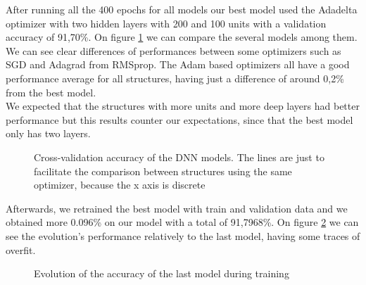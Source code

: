 \documentclass[journal, a4paper]{IEEEtran}
\begin{document}
    After running all the 400 epochs for all models our best model
used the Adadelta optimizer with two hidden layers with 200 and 100 units
with a validation accuracy of 91,70\%. On figure \ref{fig:cross_val_dnn}
we can compare the several models among them. \\ We can see clear differences of performances
between some optimizers such as SGD and Adagrad from RMSprop. The Adam based optimizers all
have a good performance average for all structures, having just a difference of around
0,2\% from the best model. \\
    We expected that the structures with more units and more deep layers had
better performance but this results counter our expectations, since that the best model
only has two layers.

    \begin{figure}
      \caption{Cross-validation accuracy of the DNN models. The lines are just to
      facilitate the comparison between structures using the same optimizer, because
      the x axis is discrete}
      \label{fig:cross_val_dnn}
    \end{figure}

    Afterwards, we retrained the best model with train and validation data and
we obtained more 0.096\% on our model with a total of 91,7968\%. On figure
\ref{fig:dnn_final} we can see the evolution's performance relatively to the
last model, having some traces of overfit.

    \begin{figure}
      \caption{Evolution of the accuracy of the last model during training}
      \label{fig:dnn_final}
    \end{figure}
\end{document}
